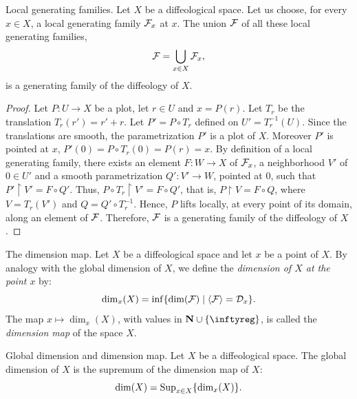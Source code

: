 \begin{Article}{Local generating families.}{}
  Let $X$ be a diffeological space.
  Let us choose,
  for every $x \in {X}$,
  a local generating family $\mathcal{F}_x$ at $x$.
  The union $\mathcal{F}$ of all these local generating families,
  $$%
    \cF = \bigcup_{x \in {X}}\cF_x,
    $$%
  is a generating family of the diffeology of $X$.
\end{Article}

\begin{proof}
  Let $P \colon U \to X$ be a plot,
  let $r \in U$ and $x = P(r)$.
  Let $T_r$ be the translation $T_r(r') = r' + r$.
  Let $P' = P \circ T_r$ defined on $U' = T_r^{-1}(U)$.
  Since the translations are smooth,
  the parametrization $P'$ is a plot of $X$.
  Moreover $P'$ is pointed at $x$,
  $P'(0) = P \circ T_r (0) = P(r) = x$.
  By definition of a local generating family,
  there exists an element $F \colon W \to X$ of $\mathcal{F}_x$,
  a neighborhood $V'$ of $0 \in U'$ and a smooth parametrization $Q' : V' \to W$,
  pointed at $0$,
  such that $P' \restriction V' = F \circ Q'$.
  Thus,
  $P \circ T_r \restriction V' = F \circ Q'$,
  that is,
  $P \restriction V = F \circ Q$,
  where $V = T_r(V')$ and $Q = Q' \circ T_r^{-1}$.
  Hence,
  $P$ lifts locally,
  at every point of its domain,
  along an element of $\mathcal{F}$.
  Therefore,
  $\mathcal{F}$ is a generating family of the diffeology of $X$.
\end{proof}

\begin{Article}{The dimension map.}{}
  Let $X$ be a diffeological space and let $x$ be a point of $X$.
  By analogy with the global dimension of $X$,
  we define the \emph{dimension of $X$ at the point $x$} by:
  $$%
    \dim_x(X) = \inf \{ \dim(\cF) \mid \langle \cF \rangle = \cD_x \}.
    $$%
  The map $x \mapsto \dim_x(X)$,
  with values in $\NN \cup \{\infty\}$,
  is called the \emph{dimension map} of the space $X$.
\end{Article}

\begin{Article}{Global dimension and dimension map.}{}
  Let $X$ be a diffeological space.
  The global dimension of $X$ is the supremum of the dimension map of $X$:
  $$%
    \dim(X) = \Sup_{x \in X} \{\dim_x(X)\}.
    $$%
\end{Article}

